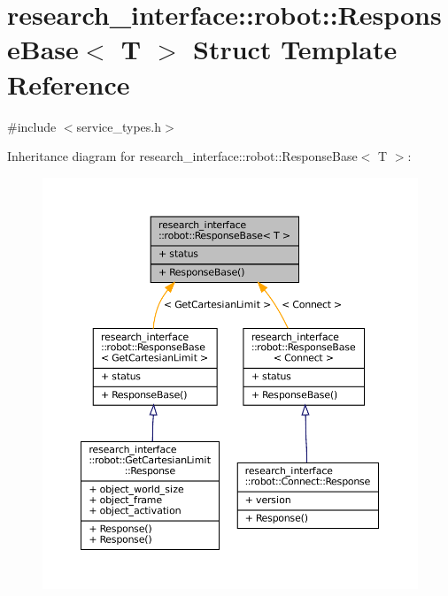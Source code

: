 \hypertarget{structresearch__interface_1_1robot_1_1ResponseBase}{}\section{research\+\_\+interface\+:\+:robot\+:\+:Response\+Base$<$ T $>$ Struct Template Reference}
\label{structresearch__interface_1_1robot_1_1ResponseBase}


{\ttfamily \#include $<$service\+\_\+types.\+h$>$}



Inheritance diagram for research\+\_\+interface\+:\+:robot\+:\+:Response\+Base$<$ T $>$\+:
\nopagebreak
\begin{figure}[H]
\begin{center}
\leavevmode
\includegraphics[width=350pt]{structresearch__interface_1_1robot_1_1ResponseBase__inherit__graph}
\end{center}
\end{figure}


